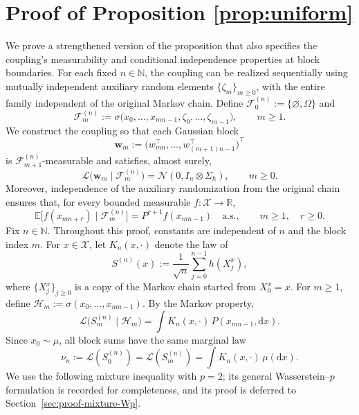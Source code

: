 \documentclass[11pt,letterpaper]{article}
\theoremstyle{plain}
\theoremstyle{definition}
\theoremstyle{remark}
\newcommand{\E}{\mathbb{E}}
\begin{document}
\section{Proof of Proposition \ref{prop:uniform}}\label{sec:proof-uniform}
We prove a strengthened version of the proposition that also specifies
the coupling's measurability and conditional independence properties at
block boundaries. For each fixed \(n\in\mathbb N\), the coupling can be
realized sequentially using mutually independent auxiliary random
elements \(\{\zeta_m\}_{m\geq0}\), with the entire family independent of
the original Markov chain. Define
\(\mathcal F_0^{(n)}:=\{\varnothing,\Omega\}\) and
\begin{equation}
\label{eq:block-boundary-filtration}
    \mathcal F_m^{(n)}
    :=
    \sigma\bigl(
        x_0,\ldots,x_{mn-1},
        \zeta_0,\ldots,\zeta_{m-1}
    \bigr),
    \qquad m\geq1.
\end{equation}
We construct the coupling so that each Gaussian block
\[
    \mathbf w_m
    :=
    \bigl(
        w_{mn}^{\top},\ldots,w_{(m+1)n-1}^{\top}
    \bigr)^{\top}
\]
is \(\mathcal F_{m+1}^{(n)}\)-measurable and satisfies, almost surely,
\begin{equation}
\label{eq:block-boundary-Gaussian}
    \mathcal L\bigl(
        \mathbf w_m\mid\mathcal F_m^{(n)}
    \bigr)
    =
    \mathcal N(0,I_n\otimes\Sigma_h),
    \qquad m\geq0.
\end{equation}
Moreover, independence of the auxiliary randomization from the original
chain ensures that, for every bounded measurable
\(f:\mathcal X\to\mathbb R\),
\begin{equation}
\label{eq:block-boundary-Markov}
    \E\bigl[
        f(x_{mn+r})\mid\mathcal F_m^{(n)}
    \bigr]
    =
    P^{r+1}f(x_{mn-1})
    \quad\text{a.s.},
    \qquad m\geq1,\quad r\geq0.
\end{equation}
Fix \(n\in\mathbb N\). Throughout this proof, constants are independent of
\(n\) and the block index \(m\). For \(x\in\mathcal X\), let
\(K_n(x,\cdot)\) denote the law of
\[
    S^{(n)}(x):=\frac1{\sqrt n}\sum_{j=0}^{n-1}h(X_j^x),
\]
where \(\{X_j^x\}_{j\geq0}\) is a copy of the Markov chain started from
\(X_0^x=x\). For \(m\geq1\), define
\(\mathcal H_m:=\sigma(x_0,\ldots,x_{mn-1})\). By the Markov property,
\[
    \mathcal L\bigl(S_m^{(n)}\mid\mathcal H_m\bigr)
    =\int K_n(x,\cdot)\,P(x_{mn-1},\mathrm dx).
\]
Since \(x_0\sim\mu\), all block sums have the same marginal law
\[
    \nu_n:=\mathcal L(S_0^{(n)})
    =\mathcal L(S_m^{(n)})
    =\int K_n(x,\cdot)\,\mu(\mathrm dx).
\]
We use the following mixture inequality with \(p=2\); its general
Wasserstein--\(p\) formulation is recorded for completeness, and its proof
is deferred to Section~\ref{sec:proof-mixture-Wp}.
\end{document}
